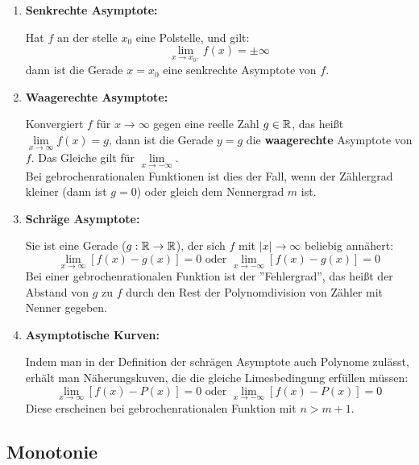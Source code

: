 \documentclass[main.tex]{subfiles}
\begin{document}
\begin{Definition}
	\begin{enumerate}
		\item \textbf{Senkrechte Asymptote:}
		
		Hat $f$ an der stelle $x_{0}$ eine Polstelle, und gilt:
			$$\lim\limits_{x \rightarrow x_{0^{\pm}}} f(x) = \pm \infty$$
		dann ist die Gerade $x=x_{0}$ eine senkrechte Asymptote von $f$.

		\item \textbf{Waagerechte Asymptote:}
		
		Konvergiert $f$ für $x\rightarrow \infty$ gegen eine reelle Zahl $g\in \mathbb{R}$, das heißt $\lim\limits_{x \rightarrow \infty }{f(x)}=g$, dann ist die Gerade $y=g$ die \textbf{waagerechte} Asymptote von $f$. Das Gleiche gilt für $\lim\limits_{x \rightarrow -\infty}$.\\
		Bei gebrochenrationalen Funktionen ist dies der Fall, wenn der Zählergrad kleiner (dann ist $g=0$) oder gleich dem Nennergrad $m$ ist.

		\item \textbf{Schräge Asymptote:}
		
		Sie ist eine Gerade ($g:\mathbb{R} \rightarrow \mathbb{R}$), der sich $f$ mit $|x|\rightarrow \infty$ beliebig annähert:
		$$\lim\limits_{x \rightarrow \infty}{[f(x)-g(x)]}=0 \text{ oder } \lim\limits_{x \rightarrow -\infty}{[f(x)-g(x)]}=0$$
		Bei einer gebrochenrationalen Funktion ist der ''Fehlergrad'', das heißt der Abstand von $g$ zu $f$ durch den Rest der Polynomdivision von Zähler mit Nenner gegeben.

		\item \textbf{Asymptotische Kurven:}
		
		Indem man in der Definition der schrägen Asymptote auch Polynome zulässt, erhält man Näherungskuven, die die gleiche Limesbedingung erfüllen müssen:
		$$\lim\limits_{x \rightarrow \infty}{[f(x)-P(x)]}=0 \text{ oder } \lim\limits_{x \rightarrow -\infty}{[f(x)-P(x)]}=0$$
		Diese erscheinen bei gebrochenrationalen Funktion mit $n>m+1$.
	\end{enumerate}
\end{Definition}

\subsection{Monotonie}
\end{document}
